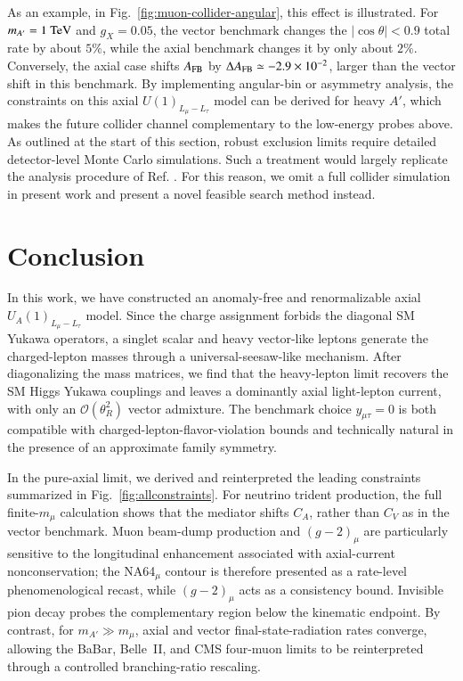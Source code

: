 \documentclass[onecolumn, aps, nofootinbib, prd, preprint, floats, floatfix, amsmath, amssymb, superscriptaddress, preprintnumbers]{revtex4-2}
\newcommand{\zb}[1]{{\color{blue} {#1}}}
\begin{document}
As an example, in Fig.~\ref{fig:muon-collider-angular}, this effect is illustrated. For $m_{A'}=1~{\rm TeV}$ and $g_X=0.05$, the vector benchmark changes the $|\cos\theta|<0.9$ total rate by about $5\%$, while the axial benchmark changes it by only about $2\%$. Conversely, the axial case shifts $A_{\rm FB}$ by $\Delta A_{\rm FB}\simeq-2.9\times10^{-2}$, larger than the vector shift in this benchmark. By implementing angular-bin or asymmetry analysis, the constraints on this axial $U(1)_{L_\mu-L_\tau}$ model can be derived for heavy $A'$, which makes the future collider channel complementary to the low-energy probes above. As outlined at the start of this section, robust exclusion limits require detailed detector-level Monte Carlo simulations. Such a treatment would largely replicate the analysis procedure of Ref. \cite{Huang:2021nkl}. For this reason, we omit a full collider simulation in present work and present a novel feasible search method instead.


\section{Conclusion}
\label{sec:conclusion}

In this work, we have constructed an anomaly-free and renormalizable axial $U_A(1)_{L_\mu-L_\tau}$ model. Since the charge assignment forbids the diagonal SM Yukawa operators, a singlet scalar and heavy vector-like leptons generate the charged-lepton masses through a universal-seesaw-like mechanism. After diagonalizing the mass matrices, we find that the heavy-lepton limit recovers the SM Higgs Yukawa couplings and leaves a dominantly axial light-lepton current, with only an $\mathcal O(\theta_R^2)$ vector admixture. The benchmark choice $y_{\mu\tau}=0$ is both compatible with charged-lepton-flavor-violation bounds and technically natural in the presence of an approximate family symmetry.
\zb{}

In the pure-axial limit, we derived and reinterpreted the leading constraints summarized in Fig.~\ref{fig:allconstraints}. For neutrino trident production, the full finite-$m_\mu$ calculation shows that the mediator shifts $C_A$, rather than $C_V$ as in the vector benchmark. Muon beam-dump production and $(g-2)_\mu$ are particularly sensitive to the longitudinal enhancement associated with axial-current nonconservation; the NA64$_\mu$ contour is therefore presented as a rate-level phenomenological recast, while $(g-2)_\mu$ acts as a consistency bound. Invisible pion decay probes the complementary region below the kinematic endpoint. By contrast, for $m_{A'}\gg m_\mu$, axial and vector final-state-radiation rates converge, allowing the BaBar, Belle~II, and CMS four-muon limits to be reinterpreted through a controlled branching-ratio rescaling.
\end{document}
